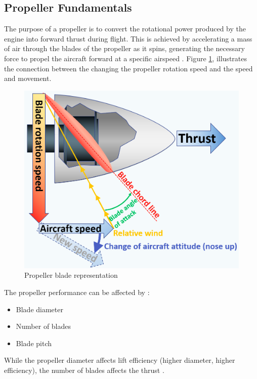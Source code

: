 \subsection{Propeller Fundamentals}
The purpose of a propeller is to convert the rotational power produced by the engine into forward thrust during flight.
This is achieved by accelerating a mass of air through the blades of the propeller as it spins, generating the necessary force to propel the aircraft forward at a specific airspeed \cite{main_uav}.
Figure \ref{fig:propeller}, illustrates the connection between the changing the propeller rotation speed and the speed and movement.

\begin{figure}[H]
    \centering
    \includegraphics[scale=0.25]{ch2/assets/propeller.png}
    \caption{Propeller blade representation \cite{propeller}}
    \label{fig:propeller}
\end{figure}

The propeller performance can be affected by \cite{main_uav}:
\begin{itemize}
    \item Blade diameter
    \item Number of blades
    \item Blade pitch
\end{itemize}

While the propeller diameter affects lift efficiency (higher diameter, higher efficiency), the number of blades affects the thrust \cite{main_uav}.

